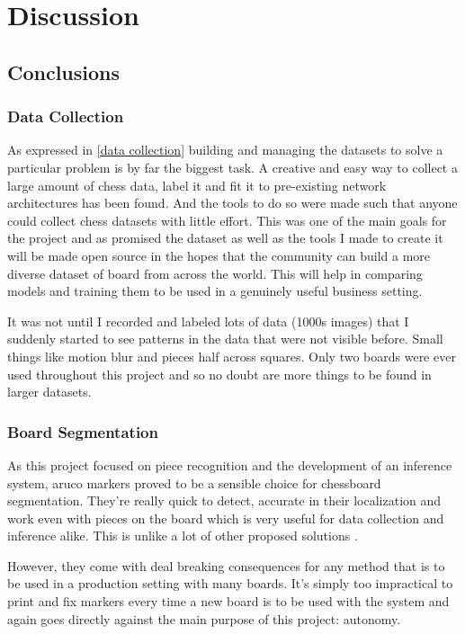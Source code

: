 \chapter{Discussion}
\label{conclusions}

\section{Conclusions}

\subsection{Data Collection}
As expressed in \autoref{data collection} building and managing the datasets to solve a particular problem is by far the biggest task.  
A creative and easy way to collect a large amount of chess data, label it and fit it to pre-existing network architectures has been found.  
And the tools to do so were made such that anyone could collect chess datasets with little effort.
This was one of the main goals for the project and as promised the dataset as well as the tools I made to create it will be made open source in 
the hopes that the community can build a more diverse dataset of board from across the world.  This will help in comparing models and training them 
to be used in a genuinely useful business setting.

It was not until I recorded and labeled lots of data (1000s images) that I suddenly started to see patterns in the data that were not visible before.  
Small things like motion blur and pieces half across squares.  Only two boards were ever used throughout this project and so no doubt are more things 
to be found in larger datasets.

\subsection{Board Segmentation}
As this project focused on piece recognition and the development of an inference system, aruco markers proved to be a sensible choice for chessboard 
segmentation.  They're really quick to detect, accurate in their localization and work even with pieces on the board which is very useful for 
data collection and inference alike. This is unlike a lot of other proposed solutions \cite{}.

However, they come with deal breaking consequences for any method that is to be used in a production setting with many boards.  
It's simply too impractical to print and fix markers every time a new board is to be used with the system and again goes directly against the main 
purpose of this project: autonomy.  

